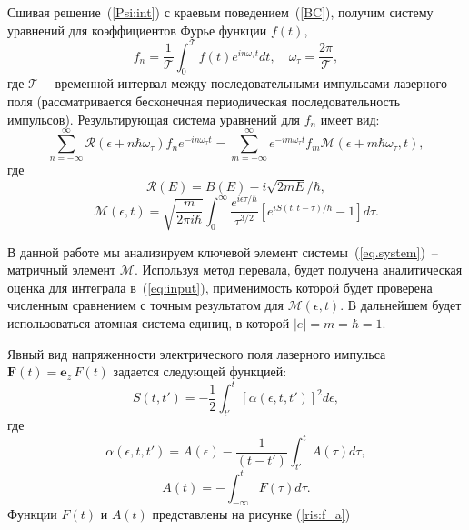 \documentclass[%
bachelor,    %
natbib,      %
subf,        %
href,        %
colorlinks,  %
]{disser}
\newcommand{\vF}{\mathbf{F}}
\newcommand{\ve}{\mathbf{e}}
\newcommand{\cR}{\mathcal{R}}
\newcommand{\cM}{\mathcal{M}}
\newcommand{\cT}{\mathcal{T}}
\begin{document}
Сшивая решение~(\ref{Psi:int}) с краевым поведением~(\ref{BC}), получим систему уравнений для коэффициентов Фурье функции $f(t)$, 
\begin{equation}
\label{forier:f}
f_n=\frac{1}{\cT}\int_0^{\cT} f(t) e^{in\omega_\tau t}dt,\quad \omega_\tau = \frac{2\pi}{\cT}, 
\end{equation}
где $\cT$~-- временной интервал между последовательными импульсами лазерного поля (рассматривается бесконечная периодическая последовательность импульсов).\cite{main}
Результирующая система уравнений для $f_n$ имеет вид:
\begin{equation}
\label{eq.system}
\sum_{n=-\infty}^\infty \cR(\epsilon+n\hbar\omega_\tau)f_ne^{-in\omega_\tau t} = \sum_{m=-\infty}^\infty e^{-im\omega_\tau t} f_m \cM(\epsilon+m\hbar\omega_\tau,t),
\end{equation}
где
\begin{equation}
\label{R}
\cR(E) = B(E) - i\sqrt{2mE}/\hbar,
\end{equation}
\begin{equation}
\label{eq:input}
\cM(\epsilon,t) = \sqrt{\frac{m}{2\pi i\hbar}}\int_0^{\infty}
\frac{e^{i\epsilon\tau/\hbar}}{\tau^{3/2}}[e^{iS(t,t-\tau)/\hbar}-1]d\tau.
\end{equation}

В данной работе мы анализируем ключевой элемент системы~(\ref{eq.system})~-- матричный элемент $\cM$. Используя метод перевала, будет получена аналитическая оценка для интеграла в~(\ref{eq:input}), применимость которой будет проверена численным сравнением с точным результатом для $\cM(\epsilon,t)$. В дальнейшем будет использоваться атомная система единиц, в которой $|e|=m=\hbar=1$.

Явный вид напряженности электрического поля лазерного импульса $\vF (t) = \ve_z\,F(t)$ задается следующей функцией:
\begin{equation}\label{eq:s}
S(t, t') = -\frac{1}{2}\int_{t'}^{t} [\alpha(\epsilon, t, t')]^2 d\epsilon,
\end{equation}
где
\begin{equation}\label{eq:alpha}
\alpha(\epsilon, t, t') = A(\epsilon) - \frac{1}{(t-t')}\int_{t'}^{t}A(\tau) d\tau,
\end{equation}
\begin{equation}\label{eq:a}
A(t) = -\int_{-\infty}^{t} F(\tau) d\tau.
\end{equation}
Функции $F(t)$ и $A(t)$ представлены на рисунке (\ref{ris:f_a})
\end{document}
